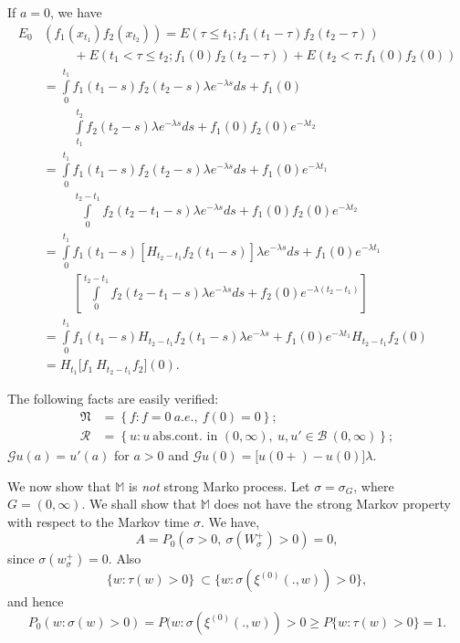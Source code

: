 If $a=0$, we have
\begin{align*}
  E_0 & (f_1(x_{t_1})f_2(x_{t_2}))=E ( \tau \leq t_1; f_1 (t_1 - \tau
  )f_2 (t_2 -\tau))\\ 
  & \hspace{1cm}+ E ( t_1 < \tau \leq t_2; f_1 (0) f_2 (t_2 -
  \tau)) + E(t_2 < \tau : f_1 (0) f_2 (0)) \\ 
  &= \int \limits^{t_1}_{0} f_1 (t_1 -s) f_2 (t_2 -s) \lambda
  e^{-\lambda s} ds + f_1 (0)\\ 
  & \hspace{1cm} \int \limits^{t_2}_{t_1} f_2 (t_2 -s)
  \lambda e^{-\lambda s} ds + f_1 (0) f_2 (0) e^{-\lambda t_2} \\ 
  &= \int \limits^{t_1}_{0} f_1 (t_1 -s) f_2 (t_2-s) \lambda e^{-
    \lambda s} ds + f_1 (0) e^{-\lambda t_1}\\ 
  & \hspace{1cm} \int \limits^{t_2
    -t_1}_{0} f_2 (t_2-t_{1}-s) \lambda e^{- \lambda s} ds +  f_1 (0) f_2
  (0) e^{-\lambda t_2} \\ 
  &= \int \limits^{t_1}_{0} f_1 (t_1 -s) \left[ H_{t_{2}-t_1} f_2 (t_1
    -s) \right]  \lambda e^{-\lambda s} ds + f_1 (0) e^{-\lambda t_1}\\
  & \hspace{1cm} \left[\int \limits^{t_2-t_1}_{0} f_2 (t_2 -t_1 -s) \lambda
    e^{-\lambda s} ds + f_2 (0) e^{-\lambda (t_2 -t_1)} \right]\\ 
  &= \int \limits^{t_1}_{0} f_1 (t_1 -s) H_{t_{2}-t_1} f_2 (t_1 -s)
  \lambda e^{-\lambda s} + f_1 (0) e^{-\lambda t_1} H_{t_{2}-t_1} f_2
  (0) \\ 
  &= H_{t_{1}} \big[ f_1 ~ H_{t_{2}-t_1} f_2 \big] (0).
\end{align*}\pageoriginale

The following facts are easily verified: 
\begin{align*}
  \mathfrak{N} &= \left \{ f : f = 0 ~ a.e., ~ f(0) = 0 \right \}; \\
  \mathscr{R} &= \left \{ u : u\ \text{abs.cont. in } (0, \infty),\
  u,u' \in \mathscr{B} ~ (0, \infty) \right \}; 
\end{align*}
$\mathscr{G} u (a) = u' (a)$ for $a > 0$ and $\mathscr{G} u (0) =
\big[ u (0+) -u (0) \big ] \lambda$. 

We now show that $\mathbb{M}$ is \textit{not} strong Marko
process. Let $\sigma = \sigma_G$, where $G = (0, \infty)$. We shall
show that $\mathbb{M}$ does not have the strong Markov property with
respect to the Markov time $\sigma$. We have, 
$$
A = P_0 ( \sigma > 0, ~ \sigma (W^+_\sigma) > 0 ) = 0,
$$
since $ \sigma (w^+_\sigma) = 0$. Also
$$
\big \{ w : \tau (w) > 0 \big \}  ~ \subset \big \{ w : \sigma (
\xi^{(0)} (.,w )) > 0 \big \}, 
$$
and hence 
$$
P_0 ( w: \sigma (w) > 0 ) = P ( w : \sigma ( \xi^{(0)} (., w )) > 0
\ge P \big \{ w : \tau (w) > 0 \big \} = 1. 
$$

